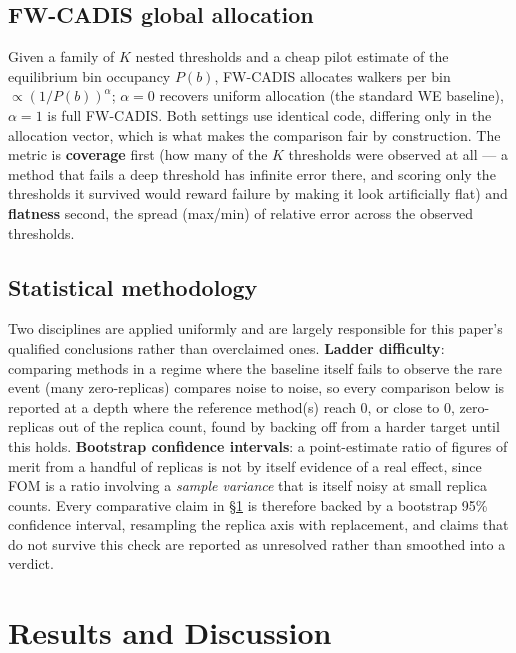 \documentclass[a4paper,fleqn]{cas-sc}
\begin{document}
	\subsection{FW-CADIS global allocation}
	Given a family of $K$ nested thresholds and a cheap pilot estimate of the equilibrium bin
	occupancy $P(b)$, FW-CADIS allocates walkers per bin $\propto (1/P(b))^\alpha$; $\alpha=0$
	recovers uniform allocation (the standard WE baseline), $\alpha=1$ is full FW-CADIS. Both
	settings use identical code, differing only in the allocation vector, which is what makes
	the comparison fair by construction. The metric is \textbf{coverage} first (how many of the
	$K$ thresholds were observed at all --- a method that fails a deep threshold has infinite
	error there, and scoring only the thresholds it survived would reward failure by making it
	look artificially flat) and \textbf{flatness} second, the spread (max/min) of relative error
	across the observed thresholds.
	
	\subsection{Statistical methodology}
	Two disciplines are applied uniformly and are largely responsible for this paper's
	qualified conclusions rather than overclaimed ones. \textbf{Ladder difficulty}: comparing
	methods in a regime where the baseline itself fails to observe the rare event (many
	zero-replicas) compares noise to noise, so every comparison below is reported at a depth
	where the reference method(s) reach 0, or close to 0, zero-replicas out of the replica
	count, found by backing off from a harder target until this holds.
	\textbf{Bootstrap confidence intervals}: a point-estimate ratio of figures of merit from a
	handful of replicas is not by itself evidence of a real effect, since FOM is a ratio
	involving a \emph{sample variance} that is itself noisy at small replica counts. Every
	comparative claim in \S\ref{sec:results} is therefore backed by a bootstrap 95\% confidence
	interval, resampling the replica axis with replacement, and claims that do not survive this
	check are reported as unresolved rather than smoothed into a verdict.
	
	\FloatBarrier
	
	\section{Results and Discussion}\label{sec:results}
	
\end{document}
